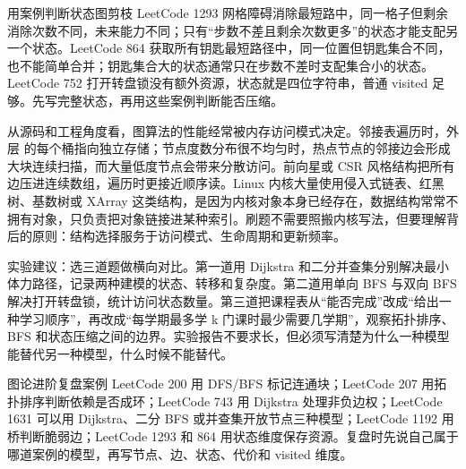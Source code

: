 \begin{principlebox}{用案例判断状态图剪枝}
LeetCode 1293 网格障碍消除最短路中，同一格子但剩余消除次数不同，未来能力不同；只有“步数不差且剩余次数更多”的状态才能支配另一个状态。LeetCode 864 获取所有钥匙最短路径中，同一位置但钥匙集合不同，也不能简单合并；钥匙集合大的状态通常只在步数不差时支配集合小的状态。LeetCode 752 打开转盘锁没有额外资源，状态就是四位字符串，普通 visited 足够。先写完整状态，再用这些案例判断能否压缩。
\end{principlebox}

\begin{deepdive}
从源码和工程角度看，图算法的性能经常被内存访问模式决定。邻接表遍历时，外层  的每个桶指向独立存储；节点度数分布很不均匀时，热点节点的邻接边会形成大块连续扫描，而大量低度节点会带来分散访问。前向星或 CSR 风格结构把所有边压进连续数组，遍历时更接近顺序读。Linux 内核大量使用侵入式链表、红黑树、基数树或 XArray 这类结构，是因为内核对象本身已经存在，数据结构常常不拥有对象，只负责把对象链接进某种索引。刷题不需要照搬内核写法，但要理解背后的原则：结构选择服务于访问模式、生命周期和更新频率。
\end{deepdive}

\begin{labbox}
实验建议：选三道题做横向对比。第一道用 Dijkstra 和二分并查集分别解决最小体力路径，记录两种建模的状态、转移和复杂度。第二道用单向 BFS 与双向 BFS 解决打开转盘锁，统计访问状态数量。第三道把课程表从“能否完成”改成“给出一种学习顺序”，再改成“每学期最多学 k 门课时最少需要几学期”，观察拓扑排序、BFS 和状态压缩之间的边界。实验报告不要求长，但必须写清楚为什么一种模型能替代另一种模型，什么时候不能替代。
\end{labbox}



\begin{principlebox}{图论进阶复盘案例}
LeetCode 200 用 DFS/BFS 标记连通块；LeetCode 207 用拓扑排序判断依赖是否成环；LeetCode 743 用 Dijkstra 处理非负边权；LeetCode 1631 可以用 Dijkstra、二分 BFS 或并查集开放节点三种模型；LeetCode 1192 用桥判断脆弱边；LeetCode 1293 和 864 用状态维度保存资源。复盘时先说自己属于哪道案例的模型，再写节点、边、状态、代价和 visited 维度。
\end{principlebox}
